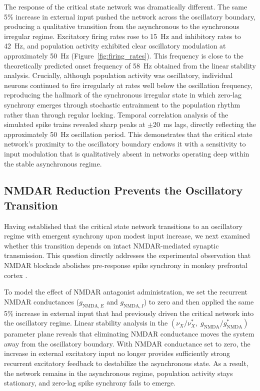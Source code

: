 \documentclass[10pt]{article}
\begin{document}
The response of the critical state network was dramatically different. The same 5\% increase in external input pushed the network across the oscillatory boundary, producing a qualitative transition from the asynchronous to the synchronous irregular regime. Excitatory firing rates rose to 15~Hz and inhibitory rates to 42~Hz, and population activity exhibited clear oscillatory modulation at approximately 50~Hz (Figure~\ref{fig:firing_rates}). This frequency is close to the theoretically predicted onset frequency of 58~Hz obtained from the linear stability analysis. Crucially, although population activity was oscillatory, individual neurons continued to fire irregularly at rates well below the oscillation frequency, reproducing the hallmark of the synchronous irregular state in which zero-lag synchrony emerges through stochastic entrainment to the population rhythm rather than through regular locking. Temporal correlation analysis of the simulated spike trains revealed sharp peaks at $\pm$20~ms lags, directly reflecting the approximately 50~Hz oscillation period. This demonstrates that the critical state network's proximity to the oscillatory boundary endows it with a sensitivity to input modulation that is qualitatively absent in networks operating deep within the stable asynchronous regime.

\subsection{NMDAR Reduction Prevents the Oscillatory Transition}

Having established that the critical state network transitions to an oscillatory regime with emergent synchrony upon modest input increase, we next examined whether this transition depends on intact NMDAR-mediated synaptic transmission. This question directly addresses the experimental observation that NMDAR blockade abolishes pre-response spike synchrony in monkey prefrontal cortex \citep{zick2018blocking}.

To model the effect of NMDAR antagonist administration, we set the recurrent NMDAR conductances ($g_{\mathrm{NMDA},E}$ and $g_{\mathrm{NMDA},I}$) to zero and then applied the same 5\% increase in external input that had previously driven the critical network into the oscillatory regime. Linear stability analysis in the $(\nu_X / \nu_X^*, \; g_{\mathrm{NMDA}} / g_{\mathrm{NMDA}}^*)$ parameter plane reveals that eliminating NMDAR conductance moves the system away from the oscillatory boundary. With NMDAR conductance set to zero, the increase in external excitatory input no longer provides sufficiently strong recurrent excitatory feedback to destabilize the asynchronous state. As a result, the network remains in the asynchronous regime, population activity stays stationary, and zero-lag spike synchrony fails to emerge.
\end{document}
